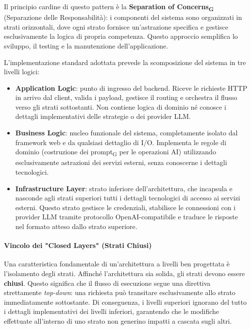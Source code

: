 \documentclass[11pt,a4paper]{article}
\newcommand{\gls}[1]{#1\textsubscript{G}}
\begin{document}
Il principio cardine di questo pattern è la \textbf{\gls{Separation of Concerns}} (Separazione delle Responsabilità): i componenti del sistema sono organizzati in strati orizzontali, dove ogni strato fornisce un'astrazione specifica e gestisce esclusivamente la logica di propria competenza. Questo approccio semplifica lo sviluppo, il testing e la manutenzione dell'applicazione.

L'implementazione standard adottata prevede la scomposizione del sistema in tre livelli logici:
\begin{itemize}
    \item \textbf{Application Logic}: punto di ingresso del backend. Riceve le richieste HTTP in arrivo dal client, valida i payload, gestisce il routing e orchestra il flusso verso gli strati sottostanti. Non contiene logica di dominio né conosce i dettagli implementativi delle strategie o dei provider LLM.
    \item \textbf{Business Logic}: nucleo funzionale del sistema, completamente isolato dal framework web e da qualsiasi dettaglio di I/O. Implementa le regole di dominio (costruzione dei \gls{prompt} per le operazioni AI) utilizzando esclusivamente astrazioni dei servizi esterni, senza conoscerne i dettagli tecnologici.
    \item \textbf{Infrastructure Layer}: strato inferiore dell'architettura, che incapsula e nasconde agli strati superiori tutti i dettagli tecnologici di accesso ai servizi esterni. Questo strato gestisce le credenziali, stabilisce le connessioni con i provider LLM tramite protocollo OpenAI-compatibile e traduce le risposte nel formato atteso dallo strato superiore.
\end{itemize}

\paragraph{Vincolo dei "Closed Layers" (Strati Chiusi)}
Una caratteristica fondamentale di un'architettura a livelli ben progettata è l'isolamento degli strati. Affinché l'architettura sia solida, gli strati devono essere \textbf{chiusi}. Questo significa che il flusso di esecuzione segue una direttiva strettamente \textit{top-down}: una richiesta può transitare esclusivamente allo strato immediatamente sottostante. Di conseguenza, i livelli superiori ignorano del tutto i dettagli implementativi dei livelli inferiori, garantendo che le modifiche effettuate all'interno di uno strato non generino impatti a cascata sugli altri.
\end{document}
